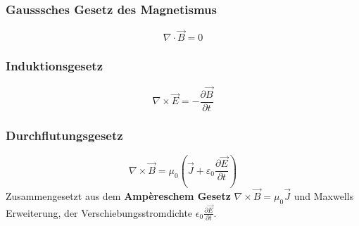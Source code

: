 \subsubsection{Gausssches Gesetz des Magnetismus}
\[
    \nabla \cdot \vec{B} = 0
\]
\subsubsection{Induktionsgesetz}
\[
    \nabla \times \vec{E} = -\frac{\partial \vec{B}}{\partial t}
\]
\subsubsection{Durchflutungsgesetz}
\[
    \nabla \times \vec{B} = \mu_0(\vec{J}+\varepsilon_0\frac{\partial \vec{E}}{\partial t})
\]
Zusammengesetzt aus dem \textbf{Ampèreschem Gesetz} $\nabla \times \vec{B} = \mu_0\vec{J}$ und Maxwells Erweiterung, der Verschiebungsstromdichte $\epsilon_0\frac{\partial \vec{E}}{\partial t}$.
